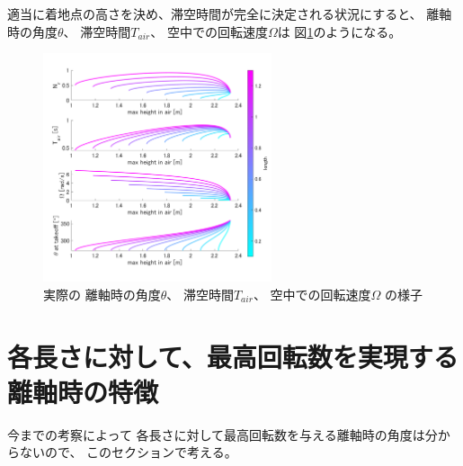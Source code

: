 \documentclass[a4paper,11pt]{jsarticle}
\begin{document}
適当に着地点の高さを決め、滞空時間が完全に決定される状況にすると、
離軸時の角度$\theta$、
滞空時間$T_{air}$、
空中での回転速度$\Omega$は
図\ref{result.png}のようになる。
\begin{figure}[h]
  \centering
  \includegraphics[width = 0.6\textwidth]{result.png}
  \caption{
    実際の
    離軸時の角度$\theta$、
    滞空時間$T_{air}$、
    空中での回転速度$\Omega$
    の様子
    }
  \label{result.png}
\end{figure}

\section{各長さに対して、最高回転数を実現する離軸時の特徴}

今までの考察によって
各長さに対して最高回転数を与える離軸時の角度は分からないので、
このセクションで考える。
\end{document}
